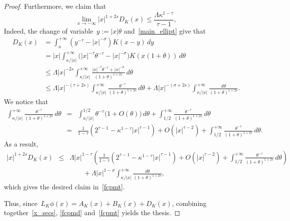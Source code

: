 \documentclass[10pt,a4paper]{amsart}
\numberwithin{equation}{section}
\begin{document}
\begin{proof}
Furthermore, we claim that
\begin{equation}\label{fcpmt}
\lim_{x \to - \infty} |x |^{1+2s} D_K(x) \leq  \frac{\Lambda\kappa^{1-\tau}}{\tau-1},
\end{equation}
Indeed, the change of variable~$y:=|x|\theta$ 
and~\eqref{main_ellipt} give that
\begin{equation*}
\begin{split}
D_K(x)&= \int_{\kappa}^{+\infty} (y^{-\tau} - |x |^{-\sigma})K(x-y) \, dy \\
&= |x |\int_{{\kappa}/{|x|}}^{+\infty}\big(
|x |^{-\tau} \theta^{-\tau} - |x |^{-\sigma}\big) K(x (1+\theta))\, d\theta\\
&\leq \Lambda |x |^{-2s} \int_{{\kappa}/{|x|}}^{+\infty} \frac{|x |^{-\tau} \theta^{-\tau} +|x |^{-\sigma}}{(1+\theta)^{1+2s}}\, d\theta\\
&\leq  \Lambda |x |^{-(\tau+2s)} 
\int_{{\kappa}/{|x|}}^{+\infty}  \frac{\theta^{-\tau}}{(1+\theta)^{1+2s}}\, d\theta
+\Lambda | x |^{-(\sigma+2s)}
\int_{{\kappa}/{| x|}}^{+\infty} \frac{d\theta}{(1+\theta)^{1+2s}}.
\end{split}\end{equation*}
We notice that
\begin{eqnarray*}
\int_{{\kappa}/{|x|}}^{+\infty}  \frac{\theta^{-\tau}}{(1+\theta)^{1+2s}}\, d\theta
&=&\int_{{\kappa}/{|x|}}^{1/2}
\theta^{-\tau}\big(1+O(\theta)\big)\, d\theta
+ \int_{1/2}^{+\infty}  \frac{\theta^{-\tau}}{(1+\theta)^{1+2s}}\, d\theta\\
&=&\frac{1}{1-\tau}\left( 2^{\tau-1}-\kappa^{1-\tau}|x|^{\tau-1}
\right) + O(|x|^{\tau-2})
+ \int_{1/2}^{+\infty}  \frac{\theta^{-\tau}}{(1+\theta)^{1+2s}}\, d\theta.
\end{eqnarray*}
As a result,
\begin{eqnarray*}
|x|^{1+2s}D_K(x)&\le& 
\Lambda|x|^{1-\tau}\left(\frac{1}{1-\tau}\left( 2^{\tau-1}-\kappa^{1-\tau}|x|^{\tau-1}
\right) + O(|x|^{\tau-2})
+ \int_{1/2}^{+\infty}  \frac{\theta^{-\tau}}{(1+\theta)^{1+2s}}\, d\theta\right)\\&&\qquad
+\Lambda |x |^{1-\sigma}
\int_{{\kappa}/{|x|}}^{+\infty} \frac{d\theta}{(1+\theta)^{1+2s}},
\end{eqnarray*}
which gives the desired claim in~\eqref{fcpmt}.

Thus, since~$L_K\phi(x)= A_K(x) + B_K(x) + D_K(x)$,
combining together~\eqref{x_secs}, \eqref{fcpmd} and~\eqref{fcpmt} yields the thesis.
\end{proof}    
\end{document}
